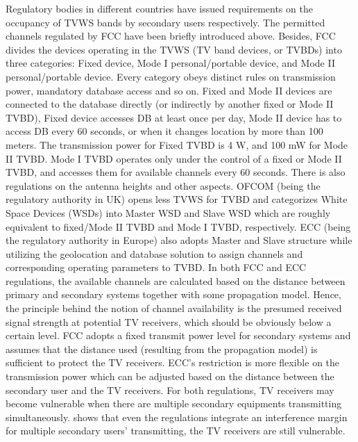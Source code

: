 Regulatory bodies in different countries have issued requirements on the occupancy of TVWS bands by secondary users respectively. 
The permitted channels regulated by FCC have been briefly introduced above.
Besides, FCC divides the devices operating in the TVWS (TV band devices, or \glspl{TVBD}) into three categories: Fixed device, Mode I personal/portable device, and Mode II personal/portable device. Every category obeys distinct rules on transmission power, mandatory database access and so on.
Fixed and Mode II devices are connected to the database directly (or indirectly by another fixed or Mode II TVBD), Fixed device accesses DB at least once per day, Mode II device has to access DB every 60 seconds, or when it changes location by more than 100 meters.
The transmission power for Fixed TVBD is 4 W, and 100 mW for Mode II TVBD. 
Mode I TVBD operates only under the control of a fixed or Mode II TVBD, and accesses them for available channels every 60 seconds.
There is also regulations on the antenna heights and other aspects.
OFCOM (being the regulatory authority in UK) opens less TVWS for TVBD and categorizes White Space Devices (WSDs) into Master WSD and Slave WSD which are roughly equivalent to fixed/Mode II TVBD and Mode I TVBD, respectively.
ECC (being the regulatory authority in Europe) also adopts Master and Slave structure while utilizing the geolocation and database solution to assign channels and corresponding operating parameters to TVBD.
In both FCC and ECC regulations, the available channels are calculated based on the distance between primary and secondary systems together with some propagation model.
Hence, the principle behind the notion of channel availability is the presumed received signal strength at potential TV receivers, which should be obviously below a certain level.
FCC adopts a fixed transmit power level for secondary systems and assumes that the distance used (resulting from the propagation model) is sufficient to protect the TV receivers.
ECC's restriction is more flexible on the transmission power which can be adjusted based on the distance between the secondary user and the TV receivers. 
For both regulations, TV receivers may become vulnerable when there are multiple secondary equipments transmitting simultaneously.
\cite{Jaentti11} shows that even the regulations integrate an interference margin for multiple secondary users' transmitting, the TV receivers are still vulnerable.

